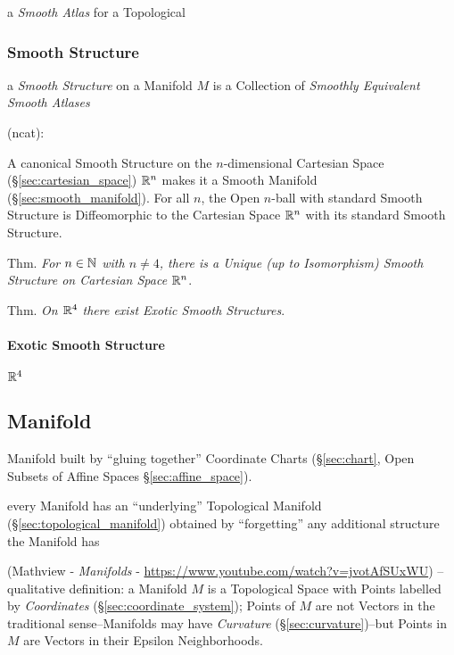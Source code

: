 a \emph{Smooth Atlas} for a Topological



\subsubsection{Smooth Structure}\label{sec:smooth_structure}

a \emph{Smooth Structure} on a Manifold $M$ is a Collection of \emph{Smoothly
  Equivalent Smooth Atlases}

(ncat):

A canonical Smooth Structure on the $n$-dimensional Cartesian Space
(\S\ref{sec:cartesian_space}) $\mathbb{R}^n$ makes it a Smooth Manifold
(\S\ref{sec:smooth_manifold}). For all $n$, the Open $n$-ball with standard
Smooth Structure is Diffeomorphic to the Cartesian Space $\mathbb{R}^n$ with its
standard Smooth Structure.

Thm. \emph{For $n \in \mathbb{N}$ with $n \neq 4$, there is a Unique (up to
  Isomorphism) Smooth Structure on Cartesian Space $\mathbb{R}^n$}.

Thm. \emph{On $\mathbb{R}^4$ there exist Exotic Smooth Structures}.



\paragraph{Exotic Smooth Structure}\label{sec:exotic_smooth_structure}\hfill

$\mathbb{R}^4$



\subsection{Manifold}\label{sec:manifold}


Manifold built by ``gluing together'' Coordinate Charts (\S\ref{sec:chart}, Open
Subsets of Affine Spaces \S\ref{sec:affine_space}).

every Manifold has an ``underlying'' Topological Manifold
(\S\ref{sec:topological_manifold}) obtained by ``forgetting'' any additional
structure the Manifold has

(Mathview - \emph{Manifolds} -
\url{https://www.youtube.com/watch?v=jvotAfSUxWU}) -- qualitative definition: a
Manifold $M$ is a Topological Space with Points labelled by \emph{Coordinates}
(\S\ref{sec:coordinate_system}); Points of $M$ are not Vectors in the
traditional sense--Manifolds may have \emph{Curvature}
(\S\ref{sec:curvature})--but Points in $M$ are Vectors in their Epsilon
Neighborhoods.

